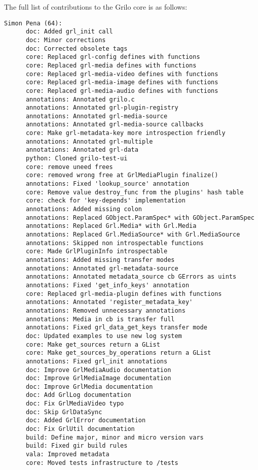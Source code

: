 The full list of contributions to the Grilo core is as follows:
\begin{verbatim}
Simon Pena (64):
      doc: Added grl_init call
      doc: Minor corrections
      doc: Corrected obsolete tags
      core: Replaced grl-config defines with functions
      core: Replaced grl-media defines with functions
      core: Replaced grl-media-video defines with functions
      core: Replaced grl-media-image defines with functions
      core: Replaced grl-media-audio defines with functions
      annotations: Annotated grilo.c
      annotations: Annotated grl-plugin-registry
      annotations: Annotated grl-media-source
      annotations: Annotated grl-media-source callbacks
      core: Make grl-metadata-key more introspection friendly
      annotations: Annotated grl-multiple
      annotations: Annotated grl-data
      python: Cloned grilo-test-ui
      core: remove uneed frees
      core: removed wrong free at GrlMediaPlugin finalize()
      annotations: Fixed 'lookup_source' annotation
      core: Remove value destroy_func from the plugins' hash table
      core: check for 'key-depends' implementation
      annotations: Added missing colon
      annotations: Replaced GObject.ParamSpec* with GObject.ParamSpec
      annotations: Replaced Grl.Media* with Grl.Media
      annotations: Replaced Grl.MediaSource* with Grl.MediaSource
      annotations: Skipped non introspectable functions
      core: Made GrlPluginInfo introspectable
      annotations: Added missing transfer modes
      annotations: Annotated grl-metadata-source
      annotations: Annotated metadata_source cb GErrors as uints
      annotations: Fixed 'get_info_keys' annotation
      core: Replaced grl-media-plugin defines with functions
      annotations: Annotated 'register_metadata_key'
      annotations: Removed unnecessary annotations
      annotations: Media in cb is transfer full
      annotations: Fixed grl_data_get_keys transfer mode
      doc: Updated examples to use new log system
      core: Make get_sources return a GList
      core: Make get_sources_by_operations return a GList
      annotations: Fixed grl_init annotations
      doc: Improve GrlMediaAudio documentation
      doc: Improve GrlMediaImage documentation
      doc: Improve GrlMedia documentation
      doc: Add GrlLog documentation
      doc: Fix GrlMediaVideo typo
      doc: Skip GrlDataSync
      doc: Added GrlError documentation
      doc: Fix GrlUtil documentation
      build: Define major, minor and micro version vars
      build: Fixed gir build rules
      vala: Improved metadata
      core: Moved tests infrastructure to /tests

\end{verbatim}
